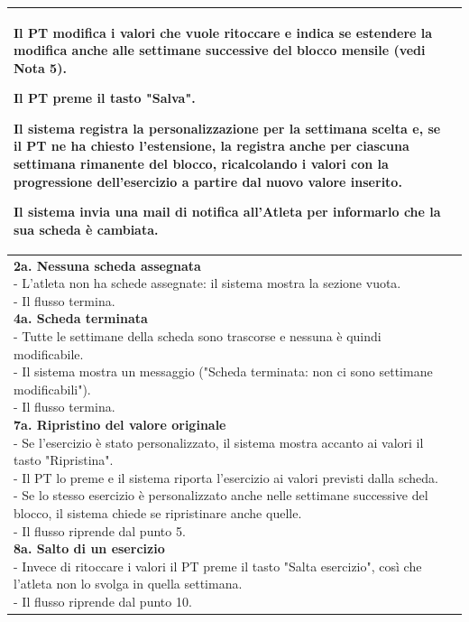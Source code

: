 \documentclass[../../../../SoftwareRequirementsSpecification.tex]{subfiles}
\begin{document}
\begin{tabularx}{\textwidth}{|l|X|}
{    \item Il PT modifica i valori che vuole ritoccare e indica se
      estendere la modifica anche alle settimane successive del
      blocco mensile (vedi Nota 5).
    \item Il PT preme il tasto "Salva".
    \item Il sistema registra la personalizzazione per la settimana
      scelta e, se il PT ne ha chiesto l'estensione, la registra
      anche per ciascuna settimana rimanente del blocco, ricalcolando
      i valori con la progressione dell'esercizio a partire dal nuovo
      valore inserito.
    \item Il sistema invia una mail di notifica all'Atleta per
      informarlo che la sua scheda è cambiata.
  } \\ \hline
  \ucaltflow{
    \textbf{2a. Nessuna scheda assegnata} \newline
    - L'atleta non ha schede assegnate: il sistema mostra la
    sezione vuota. \newline
    - Il flusso termina. \newline
    \textbf{4a. Scheda terminata} \newline
    - Tutte le settimane della scheda sono trascorse e nessuna è
    quindi modificabile. \newline
    - Il sistema mostra un messaggio ("Scheda terminata: non ci sono
    settimane modificabili"). \newline
    - Il flusso termina. \newline
    \textbf{7a. Ripristino del valore originale} \newline
    - Se l'esercizio è stato personalizzato, il sistema mostra
    accanto ai valori il tasto "Ripristina". \newline
    - Il PT lo preme e il sistema riporta l'esercizio ai valori
    previsti dalla scheda. \newline
    - Se lo stesso esercizio è personalizzato anche nelle settimane
    successive del blocco, il sistema chiede se ripristinare anche
    quelle. \newline
    - Il flusso riprende dal punto 5. \newline
    \textbf{8a. Salto di un esercizio} \newline
    - Invece di ritoccare i valori il PT preme il tasto "Salta
    esercizio", così che l'atleta non lo svolga in quella
    settimana. \newline
    - Il flusso riprende dal punto 10. \newline
}
\end{tabularx}
\end{document}
